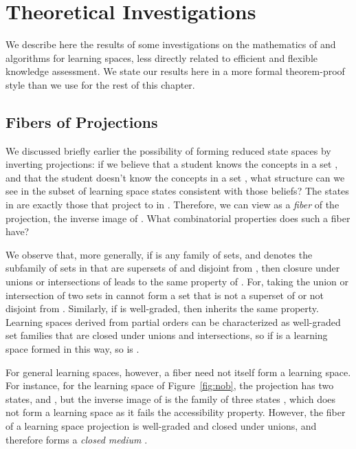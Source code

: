 \documentclass[11pt]{llncs}
\begin{document}
{\section{Theoretical Investigations}

We describe here the results of some investigations on the mathematics of and algorithms for learning spaces, less directly related to efficient and flexible knowledge assessment. We state our results here in a more formal theorem-proof style than we use for the rest of this chapter.
 
\subsection{Fibers of Projections}

We discussed briefly earlier the possibility of forming reduced state spaces by inverting projections: if we believe that a student knows the concepts in a set , and that the student doesn't know the concepts in a set , what structure can we see in the subset of learning space states  consistent with those beliefs? The states in  are exactly those that project to  in . Therefore, we can view  as a \emph{fiber} of the projection, the inverse image of . What combinatorial properties does such a fiber have?

We observe that, more generally, if  is any family of sets, and  denotes the subfamily of sets in  that are supersets of  and disjoint from , then closure under unions or intersections of  leads to the same property of . For, taking the union or intersection of two sets in  cannot form a set that is not a superset of  or not disjoint from .
Similarly, if  is well-graded, then  inherits the same property.
Learning spaces derived from partial orders can be characterized as well-graded set families that are closed under unions and intersections, so if  is a learning space formed in this way, so is
.

For general learning spaces, however, a fiber need not itself form a learning space. For instance, for the learning space  of Figure~\ref{fig:nob}, the projection  has two states,  and , but the inverse image  of  is the family of three states , which does not form a learning space as it fails the accessibility property. However, the fiber of a learning space projection is well-graded and closed under unions, and therefore forms a \emph{closed medium} \citep{falma02}.

}
\end{document}
